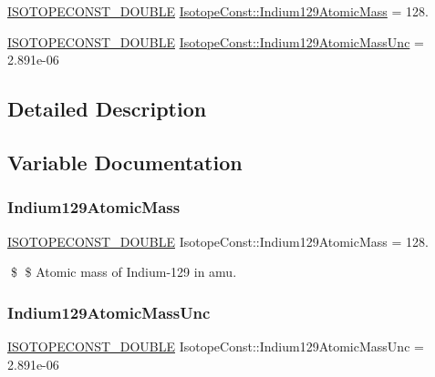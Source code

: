 \begin{DoxyCompactItemize}
\item 
\mbox{\hyperlink{group___isotope_const-_macros_ga8f45a7272ce02c0b4c65c44636ed719a}{I\+S\+O\+T\+O\+P\+E\+C\+O\+N\+S\+T\+\_\+\+D\+O\+U\+B\+LE}} \mbox{\hyperlink{group___isotope_const-_indium-_in129_ga38da24b85fff6356594087d7aa627675}{Isotope\+Const\+::\+Indium129\+Atomic\+Mass}} = 128.
\item 
\mbox{\hyperlink{group___isotope_const-_macros_ga8f45a7272ce02c0b4c65c44636ed719a}{I\+S\+O\+T\+O\+P\+E\+C\+O\+N\+S\+T\+\_\+\+D\+O\+U\+B\+LE}} \mbox{\hyperlink{group___isotope_const-_indium-_in129_gad37f51a78c284de9bfe3375c1228b5a3}{Isotope\+Const\+::\+Indium129\+Atomic\+Mass\+Unc}} = 2.\+891e-\/06
\end{DoxyCompactItemize}


\subsection{Detailed Description}


\subsection{Variable Documentation}
\mbox{\label{group___isotope_const-_indium-_in129_ga38da24b85fff6356594087d7aa627675}} 
\subsubsection{\texorpdfstring{Indium129\+Atomic\+Mass}{Indium129AtomicMass}}
{\footnotesize\ttfamily \mbox{\hyperlink{group___isotope_const-_macros_ga8f45a7272ce02c0b4c65c44636ed719a}{I\+S\+O\+T\+O\+P\+E\+C\+O\+N\+S\+T\+\_\+\+D\+O\+U\+B\+LE}} Isotope\+Const\+::\+Indium129\+Atomic\+Mass = 128.}

\$ \$ Atomic mass of Indium-\/129 in amu. \mbox{\label{group___isotope_const-_indium-_in129_gad37f51a78c284de9bfe3375c1228b5a3}} 
\subsubsection{\texorpdfstring{Indium129\+Atomic\+Mass\+Unc}{Indium129AtomicMassUnc}}
{\footnotesize\ttfamily \mbox{\hyperlink{group___isotope_const-_macros_ga8f45a7272ce02c0b4c65c44636ed719a}{I\+S\+O\+T\+O\+P\+E\+C\+O\+N\+S\+T\+\_\+\+D\+O\+U\+B\+LE}} Isotope\+Const\+::\+Indium129\+Atomic\+Mass\+Unc = 2.\+891e-\/06}

